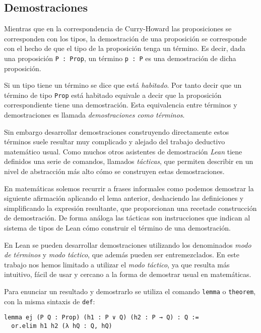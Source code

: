 \subsection{Demostraciones}

Mientras que en la correspondencia de Curry-Howard las proposiciones se
corresponden con los tipos, la demostración de una proposición se corresponde
con el hecho de que el tipo de la proposición tenga un término. Es decir, dada
una proposición \lstinline{P : Prop}, un término \lstinline{p : P} es una
demostración de dicha proposición.

Si un tipo tiene un término se dice que está \textit{habitado}. Por tanto decir
que un término de tipo \lstinline{Prop} está habitado equivale a decir que la
proposición correspondiente tiene una demostración. Esta equivalencia entre
términos y demostraciones es llamada \textit{demostraciones como términos}.

Sin embargo desarrollar demostraciones construyendo directamente estos términos
suele resultar muy complicado y alejado del trabajo deductivo matemático usual.
Como muchos otros asistentes de demostración \textit{Lean} tiene definidos una
serie de comandos, llamados \textit{tácticas}, que permiten describir en un
nivel de abstracción más alto cómo se construyen estas demostraciones.

En matemáticas solemos recurrir a frases informales como \guillemotleft podemos
demostrar la siguiente afirmación aplicando el lema anterior, deshaciendo las
definiciones y simplificando la expresión resultante\guillemotright, que
proporcionan una \guillemotleft receta\guillemotright de construcción de
demostración. De forma análoga las tácticas son instrucciones que indican al
sistema de tipos de Lean cómo construir el término de una demostración.

En Lean se pueden desarrollar demostraciones utilizando los denominados
\textit{modo de términos} y \textit{modo táctico}, que además pueden ser
entremezclados. En este trabajo nos hemos limitado a utilizar el  \textit{modo
	táctico}, ya que resulta más intuitivo, fácil de usar y cercano a la forma de
demostrar usual en matemáticas.

Para enunciar un resultado y demostrarlo se utiliza el comando \lstinline{lemma}
o \lstinline{theorem}, con la misma sintaxis de \lstinline{def}:

\begin{lstlisting}
lemma ej (P Q : Prop) (h1 : P ∨ Q) (h2 : P → Q) : Q :=
  or.elim h1 h2 (λ hQ : Q, hQ)
\end{lstlisting}

